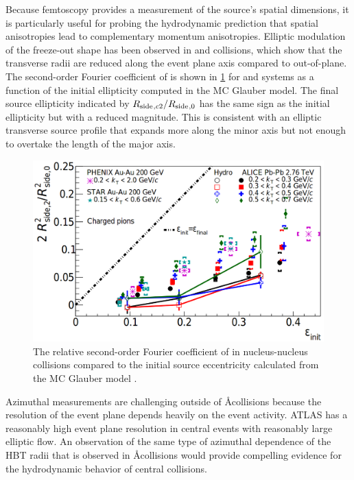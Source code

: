 Because femtoscopy provides a measurement of the source's spatial dimensions, it is particularly useful for probing the hydrodynamic prediction that spatial anisotropies lead to complementary momentum anisotropies.
Elliptic modulation of the freeze-out shape has been observed in \AuAu \cite{Adams:2003ra,Adare:2014vax,Adamczyk:2014mxp} and \PbPb \cite{Adamova:2017opl} collisions, which show that the transverse radii are reduced along the event plane axis compared to out-of-plane.
The second-order Fourier coefficient of \Rside is shown in \cref{fig:rside_v2_aa} for \AuAu and \PbPb systems as a function of the initial ellipticity computed in the MC Glauber model.
The final source ellipticity indicated by $R_{\mathrm{side}}{}_{,c2} / R_{\mathrm{side}}{}_{,0}$ has the same sign as the initial ellipticity but with a reduced magnitude.
This is consistent with an elliptic transverse source profile that expands more along the minor axis but not enough to overtake the length of the major axis.

\begin{figure}[t]
  \includegraphics{azi_hbt_aa_ellipticity.png}
  \caption{The relative second-order Fourier coefficient of \Rside in nucleus-nucleus collisions compared to the initial source eccentricity calculated from the MC Glauber model \cite{Adamova:2017opl}.}
  \label{fig:rside_v2_aa}
\end{figure}

Azimuthal measurements are challenging outside of \AA collisions because the resolution of the event plane \psit depends heavily on the event activity.
ATLAS has a reasonably high event plane resolution in central \pPb events with reasonably large elliptic flow.
An observation of the same type of azimuthal dependence of the HBT radii that is observed in \AA collisions would provide compelling evidence for the hydrodynamic behavior of central \pPb collisions.
